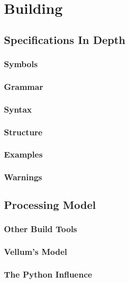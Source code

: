 \chapter{Building}
\label{chapter:Building}



\section{Specifications In Depth}


\subsection{Symbols}


\subsection{Grammar}


\subsection{Syntax}


\subsection{Structure}


\subsection{Examples}


\subsection{Warnings}



\section{Processing Model}


\subsection{Other Build Tools}


\subsection{Vellum's Model}


\subsection{The Python Influence}



